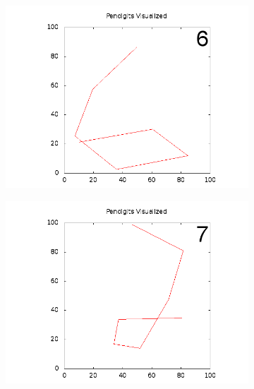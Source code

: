 \documentclass{article}
\begin{document}
\begin{figure}[h!]
  \begin{subfigure}
    \centering
    \includegraphics[scale=0.3,bb=0 0 640 480]{images/mean6.png}
    \label{picture-label}
  \end{subfigure}
  \begin{subfigure}
    \centering
    \includegraphics[scale=0.3,bb=0 0 640 480]{images/mean7.png}
    \label{picture-label}
  \end{subfigure}
  \begin{subfigure}
    \centering

\end{subfigure}
\end{figure}
\end{document}
